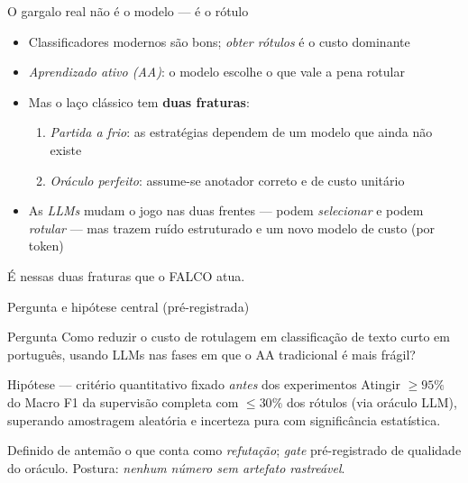 \documentclass[aspectratio=169,11pt]{beamer}
\begin{document}
\begin{frame}{O gargalo real não é o modelo --- é o rótulo}
\begin{itemize}
  \item Classificadores modernos são bons; \emph{obter rótulos} é o custo dominante
  \item \emph{Aprendizado ativo (AA)}: o modelo escolhe o que vale a pena rotular
  \item Mas o laço clássico tem \textbf{duas fraturas}:
  \begin{enumerate}
    \item \emph{Partida a frio}: as estratégias dependem de um modelo que
          ainda não existe
    \item \emph{Oráculo perfeito}: assume-se anotador correto e de custo unitário
  \end{enumerate}
  \item As \emph{LLMs} mudam o jogo nas duas frentes --- podem \emph{selecionar}
        e podem \emph{rotular} --- mas trazem ruído estruturado e um novo
        modelo de custo (por token)
\end{itemize}
\vspace{0.4em}
\centering\small\color{ufprgreen}
É nessas duas fraturas que o FALCO atua.
\end{frame}


\begin{frame}{Pergunta e hipótese central (pré-registrada)}
\begin{block}{Pergunta}
Como reduzir o custo de rotulagem em classificação de texto curto em
português, usando LLMs nas fases em que o AA tradicional é mais frágil?
\end{block}
\begin{block}{Hipótese --- critério quantitativo fixado \emph{antes} dos experimentos}
Atingir \textbf{$\ge 95\%$} do Macro F1 da supervisão completa com
\textbf{$\le 30\%$} dos rótulos (via oráculo LLM), superando amostragem
aleatória e incerteza pura com significância estatística.
\end{block}
\footnotesize
Definido de antemão o que conta como \emph{refutação}; \emph{gate}
pré-registrado de qualidade do oráculo. Postura: \emph{nenhum número sem
artefato rastreável}.
\end{frame}
\end{document}
